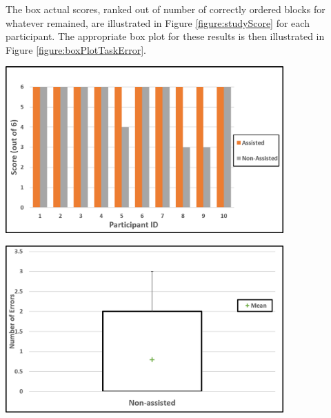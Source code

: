 \documentclass[11pt]{article}
\begin{document}
The box actual scores, ranked out of number of correctly ordered blocks for whatever remained, are illustrated in Figure \ref{figure:studyScore} for each participant. The appropriate box plot for these results is then illustrated in Figure \ref{figure:boxPlotTaskError}.


\begin{center}
\includegraphics[width=0.8\textwidth]{images/studyScore.png}
\label{figure:studyScore}
\end{center}

\begin{center}
\includegraphics[width=0.8\textwidth]{images/boxPlotTaskError.png}
\label{figure:boxPlotTaskError}
\end{center}
\end{document}
